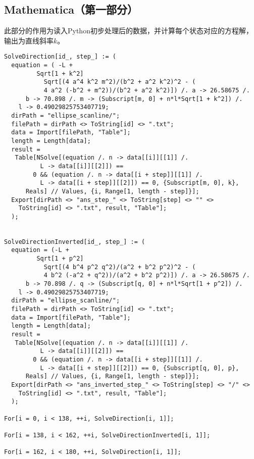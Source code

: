 \subsection{Mathematica（第一部分）}
此部分的作用为读入Python初步处理后的数据，并计算每个状态对应的方程解，输出为直线斜率$k$。

\begin{verbatim}
SolveDirection[id_, step_] := (
  equation = ( -L +
         Sqrt[1 + k^2]
           Sqrt[(4 a^4 k^2 m^2)/(b^2 + a^2 k^2)^2 - (
           4 a^2 (-b^2 + m^2))/(b^2 + a^2 k^2)]) /. a -> 26.58675 /.
      b -> 70.898 /. m -> (Subscript[m, 0] + n*l*Sqrt[1 + k^2]) /.
    l -> 0.49029825753407719;
  dirPath = "ellipse_scanline/";
  filePath = dirPath <> ToString[id] <> ".txt";
  data = Import[filePath, "Table"];
  length = Length[data];
  result =
   Table[NSolve[(equation /. n -> data[[i]][[1]] /.
          L -> data[[i]][[2]]) ==
        0 && (equation /. n -> data[[i + step]][[1]] /.
          L -> data[[i + step]][[2]]) == 0, {Subscript[m, 0], k},
      Reals] // Values, {i, Range[1, length - step]}];
  Export[dirPath <> "ans_step_" <> ToString[step] <> "" <>
    ToString[id] <> ".txt", result, "Table"];
  );


SolveDirectionInverted[id_, step_] := (
  equation = (-L +
         Sqrt[1 + p^2]
           Sqrt[(4 b^4 p^2 q^2)/(a^2 + b^2 p^2)^2 - (
           4 b^2 (-a^2 + q^2))/(a^2 + b^2 p^2)]) /. a -> 26.58675 /.
      b -> 70.898 /. q -> (Subscript[q, 0] + n*l*Sqrt[1 + p^2]) /.
    l -> 0.49029825753407719;
  dirPath = "ellipse_scanline/";
  filePath = dirPath <> ToString[id] <> ".txt";
  data = Import[filePath, "Table"];
  length = Length[data];
  result =
   Table[NSolve[(equation /. n -> data[[i]][[1]] /.
          L -> data[[i]][[2]]) ==
        0 && (equation /. n -> data[[i + step]][[1]] /.
          L -> data[[i + step]][[2]]) == 0, {Subscript[q, 0], p},
      Reals] // Values, {i, Range[1, length - step]}];
  Export[dirPath <> "ans_inverted_step_" <> ToString[step] <> "/" <>
    ToString[id] <> ".txt", result, "Table"];
  );

For[i = 0, i < 138, ++i, SolveDirection[i, 1]];

For[i = 138, i < 162, ++i, SolveDirectionInverted[i, 1]];

For[i = 162, i < 180, ++i, SolveDirection[i, 1]];
\end{verbatim}


